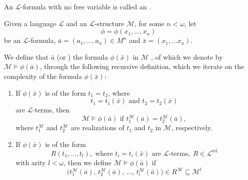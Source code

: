 \documentclass[notoc,notitlepage]{tufte-book}
\DeclareMathOperator{\rel}{rel}
\begin{document}
\begin{defn}\label{defn:;_sentences}
  An $\mathcal{L}$-formula with no free variable is called an .
\end{defn}

\begin{defn}\label{defn:satisfaction_realization}
  Given a language $\mathcal{L}$ and an $\mathcal{L}$-structure $\mathcal{M}$, for some $n < \omega$, let
  \begin{equation*}
    \phi = \phi(x_1, \ldots, x_n)
  \end{equation*}
  be an $\mathcal{L}$-formula, $\bar{a} = (a_1, \ldots, a_n) \in M^n$ and $\bar{x} = (x_1, \ldots x_n)$.

  We define that $\bar{a}$  (or ) the formula $\phi(\bar{x})$ in $\mathcal{M}$ , of which we denote by $\mathcal{M} \models \phi(\bar{a})$, through the following recursive definition, which we iterate on the complexity of the formula $\phi(\bar{x})$:
  \begin{enumerate}
    \item If $\phi(\bar{x})$ is of the form $t_1 = t_2$, where
      \begin{equation*}
        t_1 = t_1(\bar{x}) \text{ and } t_2 = t_2(\bar{x})
      \end{equation*}
      are $\mathcal{L}$-terms, then
      \begin{equation*}
        \mathcal{M} \models \phi(\bar{a}) \text{ if } t_1^\mathcal{M} (\bar{a}) = t_2^\mathcal{M} (\bar{a}),
      \end{equation*}
      where $t_1^\mathcal{M}$ and $t_2^\mathcal{M}$ are realizations of $t_1$ and $t_2$ in $\mathcal{M}$, respectively.

    \item If $\phi(\bar{x})$ is of the form
      \begin{equation*}
        R(t_1, \ldots, t_l), \text{ where } t_i = t_i(\bar{x}) \text{ are } \mathcal{L}\text{-terms}, \; R \in \mathcal{L}^{\rel}
      \end{equation*}
      with arity $l < \omega$, then we define $\mathcal{M} \models \phi(\bar{a})$ if
      \begin{equation*}
        \big(t_1^\mathcal{M} (\bar{a}), \, t_2^\mathcal{M} (\bar{a}), \, \ldots, \, t_l^\mathcal{M} (\bar{a}) \big) \in R^\mathcal{M} \subseteq \mathcal{M}^l
      \end{equation*}


\end{enumerate}
\end{defn}
\end{document}
